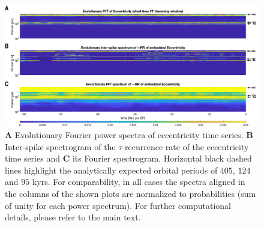 \documentclass[entropy,article,submit,pdftex,moreauthors]{Definitions/mdpi}
\begin{document}
\begin{figure}
 \centering
 \includegraphics[width=\textwidth]{./figures/fig_laskar_spectra}
 \caption{\textbf{A} Evolutionary Fourier power spectra of eccentricity time series. \textbf{B} Inter-spike spectrogram of the $\tau$-recurrence rate of the eccentricity time 
 series and \textbf{C} its Fourier spectrogram. Horizontal black dashed lines highlight the analytically expected orbital periods of $405$, $124$ and $95$ kyrs. 
 For comparability, in all cases the spectra aligned in the columns of the shown plots are normalized to probabilities (sum of unity for 
 each power spectrum). For further computational details, please refer to the main text.}  
\label{fig_laskar_spectra}
\end{figure}
\end{document}
